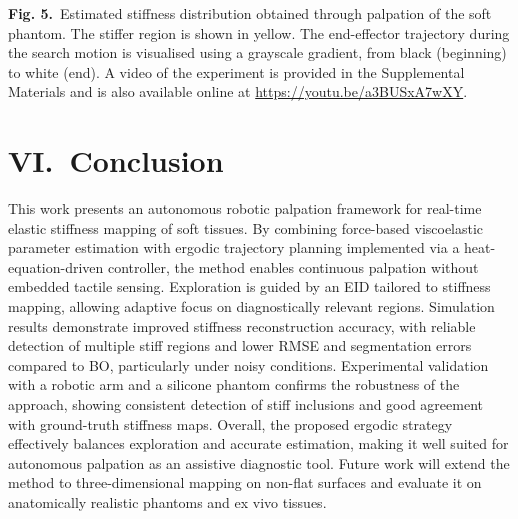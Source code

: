 \documentclass[11pt]{article}
\begin{document}
\begin{center}
\end{center}

\vspace{0.4em}

\textbf{Fig. 5.}\ Estimated stiffness distribution obtained through
palpation of the soft phantom. The stiffer region is shown in yellow.
The end-effector trajectory during the search motion is visualised
using a grayscale gradient, from black (beginning) to white (end). A
video of the experiment is provided in the Supplemental Materials
and is also available online at
\url{https://youtu.be/a3BUSxA7wXY}.

\vspace{0.8em}

\section*{VI.\ Conclusion}

This work presents an autonomous robotic palpation framework for
real-time elastic stiffness mapping of soft tissues. By combining
force-based viscoelastic parameter estimation with ergodic trajectory
planning implemented via a heat-equation-driven controller, the
method enables continuous palpation without embedded tactile sensing.
Exploration is guided by an EID tailored to stiffness mapping,
allowing adaptive focus on diagnostically relevant regions.
Simulation results demonstrate improved stiffness reconstruction
accuracy, with reliable detection of multiple stiff regions and
lower RMSE and segmentation errors compared to BO, particularly
under noisy conditions. Experimental validation with a robotic arm
and a silicone phantom confirms the robustness of the approach,
showing consistent detection of stiff inclusions and good agreement
with ground-truth stiffness maps. Overall, the proposed ergodic
strategy effectively balances exploration and accurate estimation,
making it well suited for autonomous palpation as an assistive
diagnostic tool. Future work will extend the method to
three-dimensional mapping on non-flat surfaces and evaluate it on
anatomically realistic phantoms and ex vivo tissues.
\end{document}
